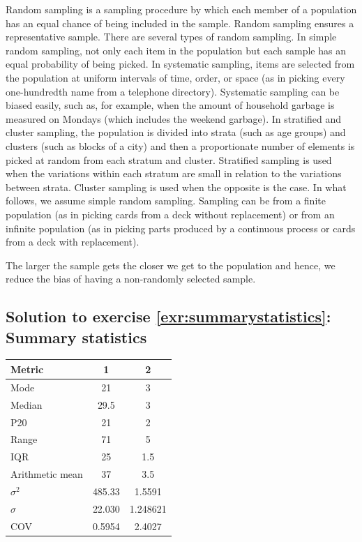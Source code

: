 \documentclass[
  12pt,
  oneside]{book}
\theoremstyle{definition}
\theoremstyle{definition}
\theoremstyle{definition}
\theoremstyle{definition}
\theoremstyle{remark}
\begin{document}
Random sampling is a sampling procedure by which each member of a population has an equal
chance of being included in the sample. Random sampling ensures a representative sample. There
are several types of random sampling. In simple random sampling, not only each item in the
population but each sample has an equal probability of being picked. In systematic sampling,
items are selected from the population at uniform intervals of time, order, or space (as in picking
every one-hundredth name from a telephone directory). Systematic sampling can be biased easily,
such as, for example, when the amount of household garbage is measured on Mondays (which
includes the weekend garbage). In stratified and cluster sampling, the population is divided into
strata (such as age groups) and clusters (such as blocks of a city) and then a proportionate
number of elements is picked at random from each stratum and cluster. Stratified sampling is
used when the variations within each stratum are small in relation to the variations between
strata. Cluster sampling is used when the opposite is the case. In what follows, we assume
simple random sampling. Sampling can be from a finite population (as in picking cards from
a deck without replacement) or from an infinite population (as in picking parts produced by a
continuous process or cards from a deck with replacement).

The larger the sample gets the closer we get to the population and hence, we reduce the bias of
having a non-randomly selected sample.

\hypertarget{sol:summarystatistics}{%
\subsection*{Solution to exercise \ref{exr:summarystatistics}: Summary statistics}\label{sol:summarystatistics}}

\begin{longtable}[]{@{}lcc@{}}
\toprule()
Metric & 1 & 2 \\
\midrule()
\endhead
Mode & 21 & 3 \\
Median & 29.5 & 3 \\
P20 & 21 & 2 \\
Range & 71 & 5 \\
IQR & 25 & 1.5 \\
Arithmetic mean & 37 & 3.5 \\
\(\sigma^2\) & 485.33 & 1.5591 \\
\(\sigma\) & 22.030 & 1.248621 \\
COV & 0.5954 & 2.4027 \\
\bottomrule()
\end{longtable}
\end{document}
